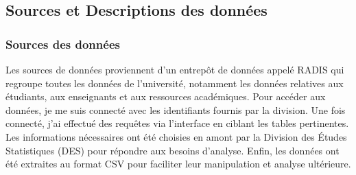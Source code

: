 \subsection{Sources et Descriptions des données}
\subsubsection{Sources des données}
Les sources de données proviennent d'un entrepôt de données appelé RADIS qui regroupe toutes les données de l'université, notamment les données relatives aux étudiants, aux enseignants et aux ressources académiques.  
Pour accéder aux données, je me suis connecté avec les identifiants fournis par la division. Une fois connecté, j'ai effectué des requêtes via l'interface en ciblant les tables pertinentes.  
Les informations nécessaires ont été choisies en amont par la Division des Études Statistiques (DES) pour répondre aux besoins d'analyse.  
Enfin, les données ont été extraites au format CSV pour faciliter leur manipulation et analyse ultérieure.

